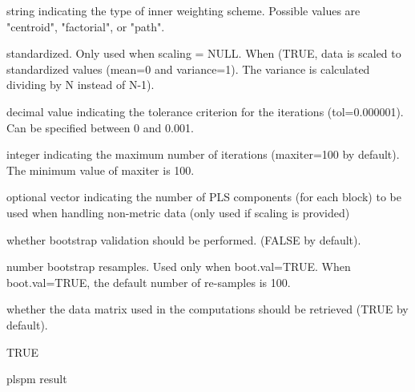 \documentclass[a4paper]{book}
\begin{document}
\begin{Arguments}
\begin{ldescription}
\item[\code{scheme}] string indicating the type of inner weighting scheme.
Possible values are "centroid", "factorial", or "path".

\item[\code{scaled}] standardized. Only used when scaling = NULL.
When (TRUE, data is scaled to standardized values (mean=0 and variance=1).
The variance is calculated dividing by N instead of N-1).

\item[\code{tol}] decimal value indicating the tolerance criterion
for the iterations (tol=0.000001). Can be specified between 0 and 0.001.

\item[\code{maxiter}] integer indicating the maximum number of iterations
(maxiter=100 by default). The minimum value of maxiter is 100.

\item[\code{plscomp}] optional vector indicating the number of PLS components
(for each block) to be used when handling non-metric data
(only used if scaling is provided)

\item[\code{boot.val}] whether bootstrap validation should be performed.
(FALSE by default).

\item[\code{br}] number bootstrap resamples. Used only when boot.val=TRUE. When boot.val=TRUE, the default number of re-samples is 100.

\item[\code{dataset}] whether the data matrix used in the computations should be retrieved (TRUE by default).

\item[\code{summary}] TRUE
\end{ldescription}
\end{Arguments}
%
\begin{Value}
plspm result
\end{Value}
%
\end{document}
